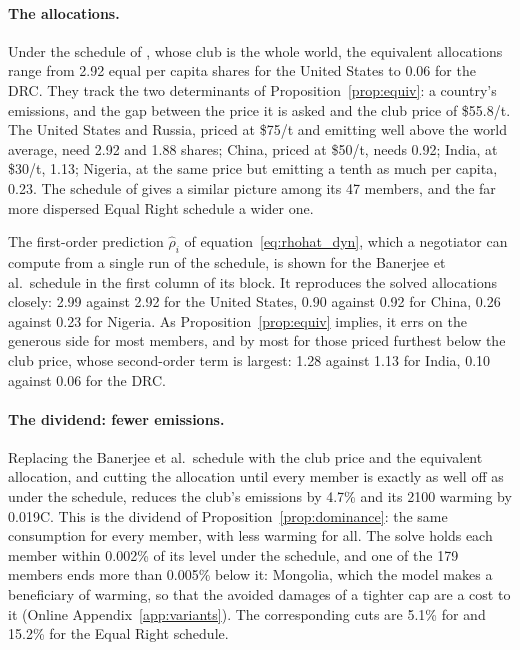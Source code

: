\documentclass[12pt,english]{article}
\theoremstyle{remark}
\begin{document}
\paragraph{The allocations.} Under the schedule of \citet{banerjee_grand_2025}, whose club is the whole world, the equivalent allocations range from 2.92 equal per capita shares for the United States to 0.06 for the DRC. They track the two determinants of Proposition~\ref{prop:equiv}: a country's emissions, and the gap between the price it is asked and the club price of \$55.8/t. The United States and Russia, priced at \$75/t and emitting well above the world average, need 2.92 and 1.88 shares; China, priced at \$50/t, needs 0.92; India, at \$30/t, 1.13; Nigeria, at the same price but emitting a tenth as much per capita, 0.23. The schedule of \citet{wolfram_building_2025} gives a similar picture among its 47 members, and the far more dispersed Equal Right schedule a wider one.

The first-order prediction $\hat\rho_i$ of equation~\eqref{eq:rhohat_dyn}, which a negotiator can compute from a single run of the schedule, is shown for the Banerjee et al.\ schedule in the first column of its block. It reproduces the solved allocations closely: 2.99 against 2.92 for the United States, 0.90 against 0.92 for China, 0.26 against 0.23 for Nigeria. As Proposition~\ref{prop:equiv} implies, it errs on the generous side for most members, and by most for those priced furthest below the club price, whose second-order term is largest: 1.28 against 1.13 for India, 0.10 against 0.06 for the DRC.

\paragraph{The dividend: fewer emissions.} Replacing the Banerjee et al.\ schedule with the club price and the equivalent allocation, and cutting the allocation until every member is exactly as well off as under the schedule, reduces the club's emissions by 4.7\% and its 2100 warming by 0.019\textdegree C. This is the dividend of Proposition~\ref{prop:dominance}: the same consumption for every member, with less warming for all. The solve holds each member within 0.002\% of its level under the schedule, and one of the 179 members ends more than 0.005\% below it: Mongolia, which the model makes a beneficiary of warming, so that the avoided damages of a tighter cap are a cost to it (Online Appendix~\ref{app:variants}). The corresponding cuts are 5.1\% for \citet{wolfram_building_2025} and 15.2\% for the Equal Right schedule.
\end{document}
